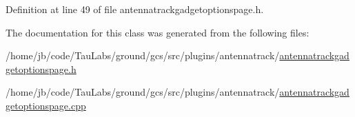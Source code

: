\-Definition at line 49 of file antennatrackgadgetoptionspage.\-h.



\-The documentation for this class was generated from the following files\-:\begin{DoxyCompactItemize}
\item 
/home/jb/code/\-Tau\-Labs/ground/gcs/src/plugins/antennatrack/\hyperlink{antennatrackgadgetoptionspage_8h}{antennatrackgadgetoptionspage.\-h}\item 
/home/jb/code/\-Tau\-Labs/ground/gcs/src/plugins/antennatrack/\hyperlink{antennatrackgadgetoptionspage_8cpp}{antennatrackgadgetoptionspage.\-cpp}\end{DoxyCompactItemize}
